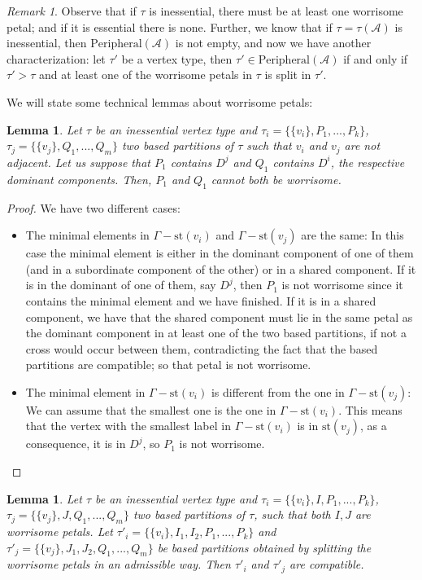 \documentclass[a4paper]{amsart}
\newcommand{\G}{\Gamma}
\newcommand{\au}{\mathcal{A}}
\newcommand{\st}{\mathrm{st}}
\newcommand{\peria}{\mathrm{Peripheral}(\au)}
\newtheorem{lem}[teo]{Lemma}
\theoremstyle{definition}
\theoremstyle{remark}
\newtheorem*{nota}{Remark}
\begin{document}
\begin{nota}
    Observe that if $\tau$ is inessential, there must be at least one worrisome petal; and if it is essential there is none. Further, we know that if $\tau=\tau(\au)$ is inessential, then $\peria$ is not empty, and now we have another characterization: let $\tau'$ be a  vertex type, then $\tau'\in\peria$ if and only if $\tau'>\tau$ and at least one of the worrisome petals in $\tau$ is split in $\tau'$.
\end{nota}


We will state some technical lemmas about worrisome petals:
\begin{lem}
     Let $\tau$ be an inessential vertex type and $\tau_i=\{\{v_i\}, P_1,...,P_k\}$, $\tau_j=\{\{v_j\},Q_1,...,Q_m\}$ two based partitions of $\tau$ such that $v_i$ and $v_j$ are not adjacent. Let us suppose that $P_1$ contains $D^j$ and $Q_1$ contains $D^i$, the respective dominant components. Then,  $P_1$ and $Q_1$ cannot both be worrisome. \label{lem:DomWorri}
\end{lem}
\begin{proof}
   We have two different cases:
\begin{itemize}
    \item [(i)] The minimal elements in $\G-\st(v_i)$ and $\G-\st(v_j)$ are the same: In this case the minimal element is either in the dominant component of one of them (and in a subordinate component of the other) or in a shared component. If it is in the dominant of one of them,  say $D^j$, then $P_1$ is not worrisome since it contains the minimal element and we have finished. If it is in a shared component, we have that the shared component must lie in the same petal as the dominant component in at least one of the two based partitions, if not a cross would occur between them, contradicting the fact that the based partitions are compatible; so that petal is not worrisome. 
    \item[(ii)] The minimal element in $\G-\st(v_i)$ is different from the one in $\G-\st(v_j)$: We can assume that the smallest one is the one in $\G-\st(v_i)$. This means that the vertex with the smallest label in $\G-\st(v_i)$ is in $\st(v_j)$, as a consequence, it is in  $D^j$, so $P_1$ is not worrisome. 
\end{itemize}

\end{proof}


\begin{lem}
    Let $\tau$ be an inessential vertex type and $\tau_i=\{\{v_i\},I, P_1,...,P_k\}$, $\tau_j=\{\{v_j\},J,Q_1,...,Q_m\}$ two based partitions of $\tau$, such that both $I,J$ are worrisome petals. Let $\tau'_i=\{\{v_i\},I_1,I_2, P_1,...,P_k\}$ and $\tau'_j=\{\{v_j\},J_1,J_2,Q_1,...,Q_m\}$ be  based partitions  obtained by splitting the worrisome petals in an admissible way. Then $\tau'_i$ and $\tau'_j$ are compatible. \label{lem:worrisomeNotImpede}
\end{lem}
\end{document}
